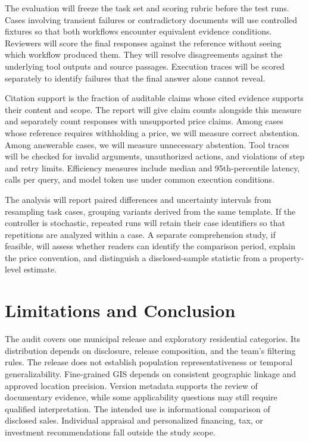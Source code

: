 \documentclass[conference]{IEEEtran}
\begin{document}
The evaluation will freeze the task set and scoring rubric before the test runs. Cases involving transient failures or contradictory documents will use controlled fixtures so that both workflows encounter equivalent evidence conditions. Reviewers will score the final responses against the reference without seeing which workflow produced them. They will resolve disagreements against the underlying tool outputs and source passages. Execution traces will be scored separately to identify failures that the final answer alone cannot reveal.

Citation support is the fraction of auditable claims whose cited evidence supports their content and scope. The report will give claim counts alongside this measure and separately count responses with unsupported price claims. Among cases whose reference requires withholding a price, we will measure correct abstention. Among answerable cases, we will measure unnecessary abstention. Tool traces will be checked for invalid arguments, unauthorized actions, and violations of step and retry limits. Efficiency measures include median and 95th-percentile latency, calls per query, and model token use under common execution conditions.

The analysis will report paired differences and uncertainty intervals from resampling task cases, grouping variants derived from the same template. If the controller is stochastic, repeated runs will retain their case identifiers so that repetitions are analyzed within a case. A separate comprehension study, if feasible, will assess whether readers can identify the comparison period, explain the price convention, and distinguish a disclosed-sample statistic from a property-level estimate.

\section{Limitations and Conclusion}
The audit covers one municipal release and exploratory residential categories. Its distribution depends on disclosure, release composition, and the team's filtering rules. The release does not establish population representativeness or temporal generalizability. Fine-grained GIS depends on consistent geographic linkage and approved location precision. Version metadata supports the review of documentary evidence, while some applicability questions may still require qualified interpretation. The intended use is informational comparison of disclosed sales. Individual appraisal and personalized financing, tax, or investment recommendations fall outside the study scope.
\end{document}
